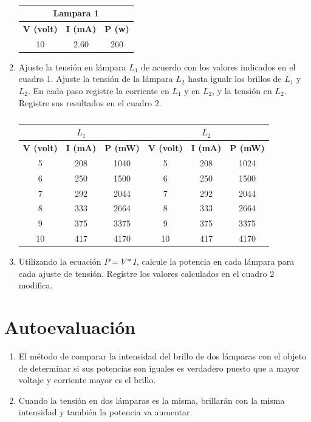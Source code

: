 \begin{enumerate}
\begin{table}[h]
		\centering
		\begin{tabular}{|c|c|c|}
			\hline
			\multicolumn{3}{c}{\textbf{Lampara 1}}\\ 
			\hline 
			\textbf{V (volt)}&\textbf{I (mA)}&\textbf{P (w)}\\
			\hline
			10 &2.60&260\\ 
			\hline
		\end{tabular}
		\caption{}
	\end{table}
	\item Ajuste la tensión en lámpara $L_{1}$  de acuerdo con los valores indicados en el cuadro 1. Ajuste la tensión de la lámpara $L_{2}$ hasta igualr los brillos de $L_{1}$ y $L_{2}$. En cada paso registre la corriente en $L_{1}$ y en $L_{2}$, y la tensión en $L_{2}$. Registre sus resultados en el cuadro 2.
	\begin{table}[h]
		\centering
		\begin{tabular}{|c|c|c|c|c|c|}
			\hline
			\multicolumn{3}{c}{\textbf{$L_{1}$}}&\multicolumn{3}{c}{\textbf{$L_{2}$}}\\
			\hline
			\textbf{V (volt)}&\textbf{I (mA)}&\textbf{P (mW)}&\textbf{V (volt)}&\textbf{I (mA)}&\textbf{P (mW)}\\
			\hline
			5&208&1040&5&208&1024\\
			\hline
			6&250&1500&6&250&1500\\
			\hline
			7&292&2044&7&292&2044\\
			\hline
			8&333&2664&8&333&2664\\
			\hline
			9&375&3375&9&375&3375\\
			\hline
			10&417&4170&10&417&4170\\
			\hline
		\end{tabular}
		\caption{}
	\end{table}
	\item Utilizando la ecuación $P=V*I$, calcule la potencia en cada lámpara para cada ajuste de tensión. Registre los valores calculados en el cuadro 2 modifica.
\end{enumerate}
\section{Autoevaluación}
\begin{enumerate}
	\item El método de comparar la intensidad del brillo de dos lámparas con el objeto de determinar si sus potencias son iguales es verdadero puesto que a mayor voltaje y corriente mayor es  el brillo.
	\item Cuando la tensión en dos lámparas es la misma, brillarán con la misma intensidad y también la potencia va aumentar.
\end{enumerate}
